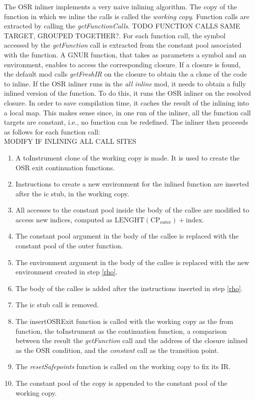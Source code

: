 The OSR inliner implements a very naive inlining algorithm.
The copy of the function in which we inline the calls is called the \textit{working copy}.
Function calls are extracted by calling the \textit{getFunctionCalls}.
TODO FUNCTION CALLS SAME TARGET, GROUPED TOGETHER?.
For each function call, the symbol accessed by the \textit{getFunction} call is extracted from the constant pool associated with the function.
A GNUR function, that takes as parameters a symbol and an environment, enables to access the corresponding closure.
If a closure is found, the default mod calls \textit{getFreshIR} on the closure to obtain the a clone of the code to inline.
If the OSR inliner runs in the \textit{all inline} mod, it needs to obtain a fully inlined version of the function.
To do this, it runs the OSR inliner on the resolved closure.
In order to save compilation time, it caches the result of the inlining into a local map.
This makes sense since, in one run of the inliner, all the function call targets are constant, i.e., no function can be redefined.
The inliner then proceeds as follows for each function call:\\

MODIFY IF INLINING ALL CALL SITES\\
\begin{enumerate}
    \item A toInstrument clone of the working copy is made. It is used to create the OSR exit continuation functions.
    \item Instructions to create a new environment for the inlined function are inserted after the ic stub, in the working copy.\label{rho}
    \item All accesses to the constant pool inside the body of the callee are modified to access new indices, computed as $\text{LENGHT}(\text{CP}_{\text{outer}}) + \text{index}$.
    \item The constant pool argument in the body of the callee is replaced with the constant pool of the outer function.
    \item The environment argument in the body of the callee is replaced with the new environment created in step \ref{rho}.
    \item The body of the callee is added after the instructions inserted in step \ref{rho}.
    \item The ic stub call is removed.
    \item The insertOSRExit function is called with the working copy as the from function, the toInstrument as the continuation function, a comparison between the result the \textit{getFunction} call and the address of the closure inlined as the OSR condition, and the \textit{constant} call as the transition point.
    \item The \textit{resetSafepoints} function is called on the working copy to fix its IR.
    \item The constant pool of the copy is appended to the constant pool of the working copy.
\end{enumerate}


